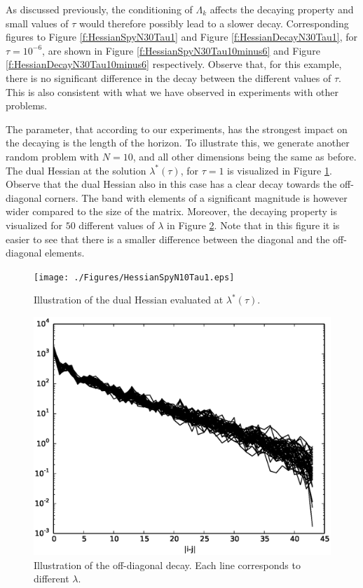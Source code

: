 As discussed previously, the conditioning of $\Lambda_k$ affects the decaying property and small values of $\tau$ would therefore possibly lead to a slower decay. Corresponding figures to Figure \ref{f:HessianSpyN30Tau1} and Figure \ref{f:HessianDecayN30Tau1}, for $\tau = 10^{-6}$, are shown in Figure \ref{f:HessianSpyN30Tau10minus6} and Figure \ref{f:HessianDecayN30Tau10minus6} respectively. Observe that, for this example, there is no significant difference in the decay between the different values of $\tau$. This is also consistent with what we have observed in experiments with other problems.

The parameter, that according to our experiments, has the strongest impact on the decaying is the length of the horizon. To illustrate this, we generate another random problem with $N=10$, and all other dimensions being the same as before. The dual Hessian at the solution $\lambda^*(\tau)$, for $\tau=1$ is visualized in Figure \ref{f:HessianSpyN10Tau1}. Observe that the dual Hessian also in this case has a clear decay towards the off-diagonal corners. The band with elements of a significant magnitude is however wider compared to the size of the matrix. Moreover, the decaying property is visualized for $50$ different values of $\lambda$ in Figure \ref{f:HessianDecayN10Tau1}. Note that in this figure it is easier to see that there is a smaller difference between the diagonal and the off-diagonal elements.

\begin{figure}[h]
  \centering
  \texttt{[image: ./Figures/HessianSpyN10Tau1.eps]}
  \caption{Illustration of the dual Hessian evaluated at $\lambda^*(\tau)$.}
  \label{f:HessianSpyN10Tau1}
\end{figure}

\begin{figure}[h]
  \centering
  \includegraphics[scale=0.4]{./Figures/HessianDecayN10Tau1.eps}
  \caption{Illustration of the off-diagonal decay. Each line corresponds to different $\lambda$.}
  \label{f:HessianDecayN10Tau1}
\end{figure}


